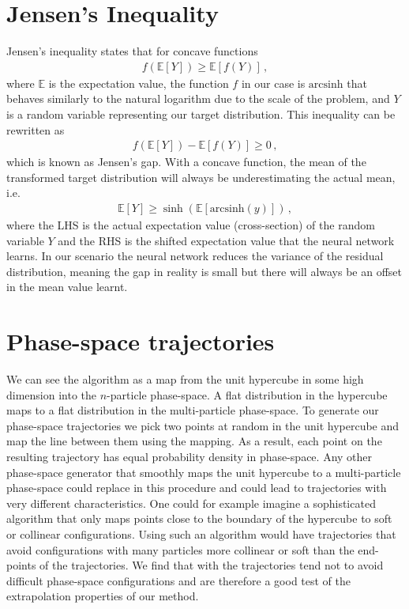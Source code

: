 \documentclass[main.tex]{subfiles}
\begin{document}
\section{Jensen's Inequality}\label{appendix:fame1_jensen}
Jensen's inequality states that for concave functions
\begin{eqnarray}
    f(\mathbb{E}[Y]) \geq \mathbb{E}[f(Y)] \, ,
\end{eqnarray}
where $\mathbb{E}$ is the expectation value, the function $f$ in our case is $\mathrm{arcsinh}$ that behaves similarly to the natural logarithm due to the scale of the problem, and $Y$ is a random variable representing our target distribution.
This inequality can be rewritten as
\begin{eqnarray}
    f(\mathbb{E}[Y]) - \mathbb{E}[f(Y)] \geq 0 \, ,
\end{eqnarray}
which is known as Jensen's gap.
With a concave function, the mean of the transformed target distribution will always be underestimating the actual mean, i.e.
\begin{eqnarray}
    \mathbb{E}[Y] \geq \sinh{(\mathbb{E}[\mathrm{arcsinh}{(y)}])} \, ,
\end{eqnarray}
where the LHS is the actual expectation value (cross-section) of the random variable $Y$ and the RHS is the shifted expectation value that the neural network learns.
In our scenario the neural network reduces the variance of the residual distribution, meaning the gap in reality is small but there will always be an offset in the mean value learnt.

\section{Phase-space trajectories}\label{appendix:fame1_trajectory_generation}
We can see the {\RAMBO} algorithm as a map from the unit hypercube in some high dimension into the $n$-particle phase-space. A flat distribution in the hypercube maps to a flat distribution in the multi-particle phase-space. 
To generate our phase-space trajectories we pick two points at random in the unit hypercube and map the line between them using the {\RAMBO} mapping. As a result, each point on the resulting trajectory has equal probability density in phase-space. 
Any other phase-space generator that smoothly maps the unit hypercube to a multi-particle phase-space could replace {\RAMBO} in this procedure and could lead to trajectories with very different characteristics. One could for example imagine a 
sophisticated algorithm that only maps points close to the boundary of the hypercube to soft or collinear configurations. Using such an algorithm would have trajectories that avoid configurations with many particles more collinear or soft than 
the end-points of the trajectories. We find that with {\RAMBO} the trajectories tend not to avoid difficult phase-space configurations and are therefore a good test of the extrapolation properties of our method.
\end{document}
